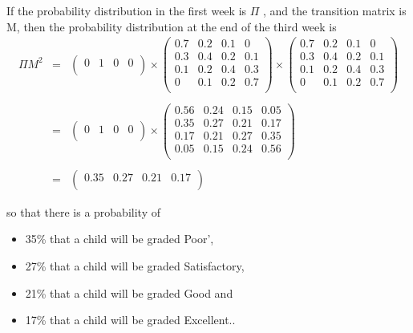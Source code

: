 \documentclass[a4paper,12pt]{article}
\begin{document}
	
	
	
	\noindent If the probability distribution in the first week is $\Pi$ , and the transition matrix is M,
	then the probability distribution at the end of the third week is
	\begin{eqnarray*} \Pi M^2 &=& 
		\begin{pmatrix}
			0	&	1	&	0 & 0 \\    
		\end{pmatrix} \times \begin{pmatrix}
		0.7	&	0.2	&	0.1 & 0 \\
		0.3	&	0.4	&	0.2 & 0.1 \\
		0.1	&	0.2	&	0.4 & 0.3 \\
		0	&	0.1	&	0.2 & 0.7 \\
	\end{pmatrix} \times \begin{pmatrix}
	0.7	&	0.2	&	0.1 & 0 \\
	0.3	&	0.4	&	0.2 & 0.1 \\
	0.1	&	0.2	&	0.4 & 0.3 \\
	0	&	0.1	&	0.2 & 0.7 \\
\end{pmatrix}\\
& & \\
&=&      \begin{pmatrix}
	0	&	1	&	0 & 0 \\    
\end{pmatrix} \times \begin{pmatrix}
0.56	&	0.24	&	0.15	&	0.05	\\ 
0.35	&	0.27	&	0.21	&	0.17	\\ 
0.17	&	0.21	&	0.27	&	0.35	\\ 
0.05	&	0.15	&	0.24	&	0.56	\\ 
\end{pmatrix}
\\
& & \\
&=&      \begin{pmatrix}
	0.35	&	0.27	&	0.21 & 0.17 \\    
\end{pmatrix} 
\end{eqnarray*}

so that there is a probability of
\begin{itemize}
	\item 35\% that a child will be graded Poor’,
	\item 27\% that a child will be graded Satisfactory,
	\item 21\% that a child will be graded Good and
	\item 17\% that a child will be graded Excellent..
\end{itemize}
\end{document}

